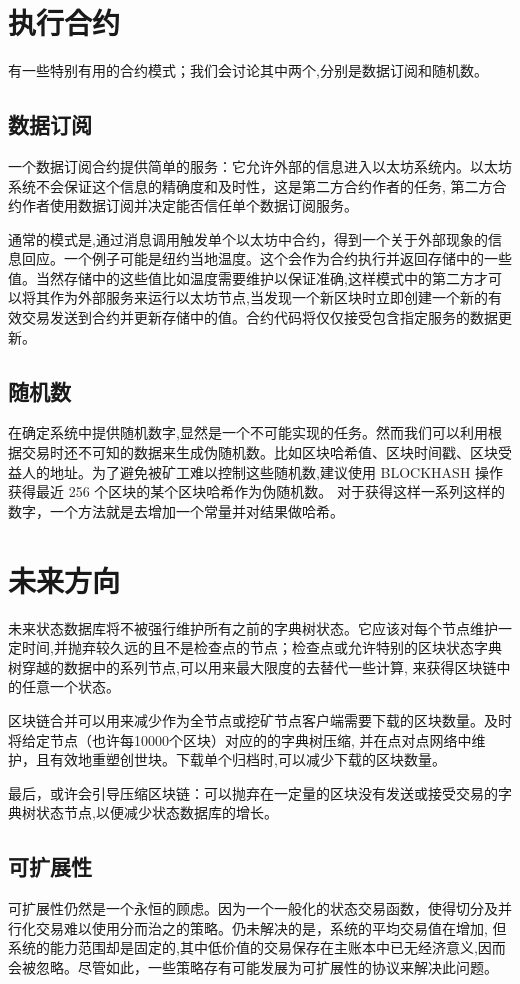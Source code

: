 \documentclass[9pt,oneside]{amsart}
\begin{document}
\begin{multicols}{2}
\section{执行合约}
有一些特别有用的合约模式；我们会讨论其中两个,分别是数据订阅和随机数。

\subsection{数据订阅}
一个数据订阅合约提供简单的服务：它允许外部的信息进入以太坊系统内。以太坊系统不会保证这个信息的精确度和及时性，这是第二方合约作者的任务, 第二方合约作者使用数据订阅并决定能否信任单个数据订阅服务。

通常的模式是,通过消息调用触发单个以太坊中合约，得到一个关于外部现象的信息回应。一个例子可能是纽约当地温度。这个会作为合约执行并返回存储中的一些值。当然存储中的这些值比如温度需要维护以保证准确,这样模式中的第二方才可以将其作为外部服务来运行以太坊节点,当发现一个新区块时立即创建一个新的有效交易发送到合约并更新存储中的值。合约代码将仅仅接受包含指定服务的数据更新。

\subsection{随机数}
在确定系统中提供随机数字,显然是一个不可能实现的任务。然而我们可以利用根据交易时还不可知的数据来生成伪随机数。比如区块哈希值、区块时间戳、区块受益人的地址。为了避免被矿工难以控制这些随机数,建议使用 {\small BLOCKHASH} 操作获得最近 256 个区块的某个区块哈希作为伪随机数。 对于获得这样一系列这样的数字，一个方法就是去增加一个常量并对结果做哈希。

\section{未来方向} \label{ch:future}
未来状态数据库将不被强行维护所有之前的字典树状态。它应该对每个节点维护一定时间,并抛弃较久远的且不是检查点的节点；检查点或允许特别的区块状态字典树穿越的数据中的系列节点,可以用来最大限度的去替代一些计算, 来获得区块链中的任意一个状态。

区块链合并可以用来减少作为全节点或挖矿节点客户端需要下载的区块数量。及时将给定节点（也许每10000个区块）对应的的字典树压缩, 并在点对点网络中维护，且有效地重塑创世块。下载单个归档时,可以减少下载的区块数量。

最后，或许会引导压缩区块链：可以抛弃在一定量的区块没有发送或接受交易的字典树状态节点,以便减少状态数据库的增长。

\subsection{可扩展性}
可扩展性仍然是一个永恒的顾虑。因为一个一般化的状态交易函数，使得切分及并行化交易难以使用分而治之的策略。仍未解决的是，系统的平均交易值在增加, 但系统的能力范围却是固定的,其中低价值的交易保存在主账本中已无经济意义,因而会被忽略。尽管如此，一些策略存有可能发展为可扩展性的协议来解决此问题。


\end{multicols}
\end{document}
